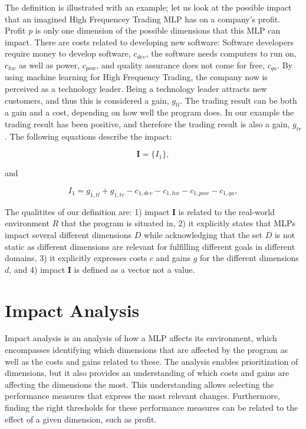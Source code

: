 \documentclass{article}
\theoremstyle{theorem}
\theoremstyle{definition}
\begin{document}
The definition is illustrated with an example; let us look at the possible impact that an imagined High Frequencey Trading MLP has on a company's profit.
Profit \emph{p} is only one dimension of the possible dimensions that this MLP can impact.
There are costs related to developing new software: Software developers require money to develop software, $c_{dev}$, the software needs computers to run on, $c_{hw}$ as well as power, $c_{pow}$, and quality assurance does not come for free, $c_{qa}$.
By using machine learning for High Frequency Trading, the company now is perceived as a technology leader. 
Being a technology leader attracts new customers, and thus this is considered a gain, $g_{tl}$.
The trading result can be both a gain and a cost, depending on how well the program does.
In our example the trading result has been positive, and therefore the trading result is also a gain, $g_{tr}$.
The following equations describe the impact:

\begin{equation}
\textbf{I} =  \{I_1\},
\end{equation}

and 

\begin{equation}
I_1= g_{1,tl} + g_{1,tr} - c_{1,dev} - c_{1,hw} - c_{1,pow} - c_{1,qa},
\end{equation}

The qualitites of our definition are: 1) impact $\textbf{I}$ is related to the real-world environment $R$ that the program is situated in, 2) it explicitly states that MLPs impact several different dimensions $D$ while acknowledging that the set $D$ is not static as different dimensions are relevant for fulfilling different goals in different domains, 3) it explicitly expresses costs $c$ and gains $g$ for the different dimensions $d$, and 4) impact $\textbf{I}$ is defined as a vector not a value.

\section{Impact Analysis}
\label{sec:impact_analysis}
Impact analysis is an analysis of how a MLP affects its environment, which encompasses identifying which dimensions that are affected by the program as well as the costs and gains related to these.
The analysis enables prioritization of dimensions, but it also provides an understanding of which costs and gains are affecting the dimensions the most.
This understanding allows selecting the performance measures that express the most relevant changes.
Furthermore, finding the right thresholds for these performance measures can be related to the effect of a given dimension, such as profit.
\end{document}
